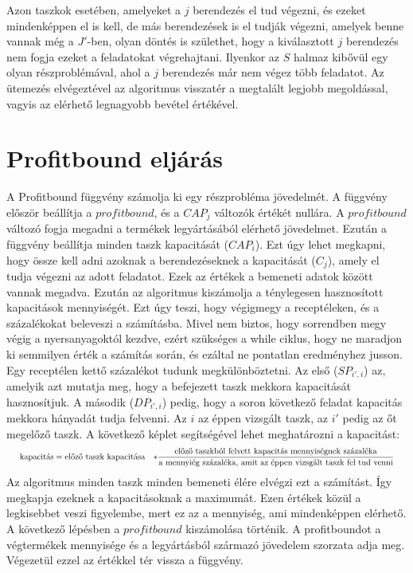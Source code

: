\newpage
Azon taszkok esetében, amelyeket a $j$ berendezés el tud végezni, és ezeket mindenképpen el is kell, de más berendezések is el tudják végezni, amelyek benne vannak még a $J'$-ben, olyan döntés is születhet, hogy a kiválasztott $j$ berendezés nem fogja ezeket a feladatokat végrehajtani.
Ilyenkor az $S$ halmaz kibővül egy olyan részproblémával, ahol a $j$ berendezés már nem végez több feladatot.
Az ütemezés elvégeztével az algoritmus visszatér a megtalált legjobb megoldással, vagyis az elérhető legnagyobb bevétel értékével.

\section{Profitbound eljárás}
A Profitbound függvény számolja ki egy részprobléma jövedelmét.
A függvény először beállítja a $profitbound$, és a $CAP_{j}$ változók értékét nullára.
A $profitbound$ változó fogja megadni a termékek legyártásából elérhető jövedelmet.
Ezután a függvény beállítja minden taszk kapacitását ($CAP_{i}$).
Ezt úgy lehet megkapni, hogy össze kell adni azoknak a berendezéseknek a kapacitását ($C_{j}$), amely el tudja végezni az adott feladatot.
Ezek az értékek a bemeneti adatok között vannak megadva.
Ezután az algoritmus kiszámolja a ténylegesen hasznosított kapacitások mennyiségét.
Ezt úgy teszi, hogy végigmegy a receptéleken, és a százalékokat beleveszi a számításba.
Mivel nem biztos, hogy sorrendben megy végig a nyersanyagoktól kezdve, ezért szükséges a while ciklus, hogy ne maradjon ki semmilyen érték a számítás során, és ezáltal ne pontatlan eredményhez jusson.
Egy receptélen kettő százalékot tudunk megkülönböztetni.
Az első ($SP_{i',i}$) az, amelyik azt mutatja meg, hogy a befejezett taszk mekkora kapacitását hasznosítjuk.
A második ($DP_{i',i}$) pedig, hogy a soron következő feladat kapacitás mekkora hányadát tudja felvenni.
Az $i$ az éppen vizsgált taszk, az $i'$ pedig az őt megelőző taszk.
A következő képlet segítségével lehet meghatározni a kapacitást:
\begin{gather}
\scalebox{0.75}{$
\begin{align*}
\text{kapacitás}&= \text{előző taszk kapacitása}&*\frac{\text{előző taszkból felvett kapacitás mennyiségnek százaléka}}{\text{a mennyiég százaléka, amit az éppen vizsgált taszk fel tud venni}}
\end{align*}$}	
\end{gather}
Az algoritmus minden taszk minden bemeneti élére elvégzi ezt a számítást.
Így megkapja ezeknek a kapacitásoknak a maximumát.
Ezen értékek közül a legkisebbet veszi figyelembe, mert ez az a mennyiség, ami mindenképpen elérhető.
A következő lépésben a $profitbound$ kiszámolása történik.
A profitboundot a végtermékek mennyisége és a legyártásból származó jövedelem szorzata adja meg.
Végezetül ezzel az értékkel tér vissza a függvény.

